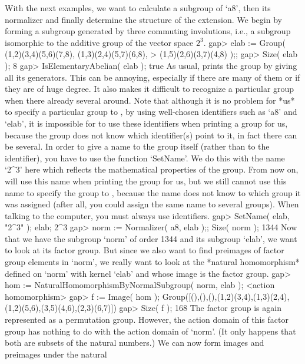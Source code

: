 With the next  examples, we want  to calculate a  subgroup of `a8', then
its  normalizer and finally determine the  structure of the extension. We
begin by forming a subgroup   generated by three commuting   involutions,
i.e., a subgroup  isomorphic to the   additive group of the  vector space
$2^3$.
\beginexample
gap> elab := Group( (1,2)(3,4)(5,6)(7,8), (1,3)(2,4)(5,7)(6,8),
>                   (1,5)(2,6)(3,7)(4,8) );;
gap> Size( elab );
8
gap> IsElementaryAbelian( elab );
true
\endexample
As usual, {\GAP} prints the group by giving  all its generators. This can
be annoying, especially if there are many of them or  if they are of huge
degree. It also makes  it difficult to recognize  a particular group when
there already several  around. Note  that  although it is no  problem for
*us* to    specify a particular  group to   {\GAP}, by  using well-chosen
identifiers such as `a8'  and `elab', it is  impossible for {\GAP} to use
these identifiers when printing  a group for us,  because the group  does
not know which identifier(s) point  to it, in fact  there can be several.
In order to    give a name  to  the  group  itself (rather   than  to the
identifier), you have to use the function `SetName'.  We do this with the
name `2^3' here which reflects  the mathematical properties of the group.
From now on,  {\GAP} will use  this name when  printing the group for us,
but we still cannot use this name to specify the group to {\GAP}, because
the name does  not know to which group   it was assigned (after  all, you
could assign the   same  name to several  groups).  When  talking  to the
computer, you must always use identifiers.
\beginexample
gap> SetName( elab, "2^3" ); elab;
2^3
gap> norm := Normalizer( a8, elab );; Size( norm );
1344
\endexample
{}%
Now that  we  have the subgroup `norm'   of order 1344   and its subgroup
`elab', we want to look  at its factor  group. But since  we also want to
find preimages of factor group elements in `norm', we really want to look
at the  *natural homomorphism* defined on  `norm' with  kernel `elab' and
whose image is the factor group.
\beginexample
gap> hom := NaturalHomomorphismByNormalSubgroup( norm, elab );
<action homomorphism>
gap> f := Image( hom );
Group([(),(),(),(1,2)(3,4),(1,3)(2,4),(1,2)(5,6),(3,5)(4,6),(2,3)(6,7)])
gap> Size( f );
168
\endexample
The factor group  is again represented as  a  permutation group. However,
the action domain  of this factor  group has  nothing  to do with  the
action domain of `norm'. (It only happens that both are subsets of the
natural numbers.) We can now form  images and preimages under the natural
